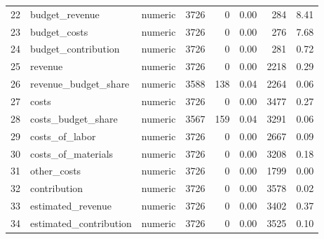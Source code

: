 \begin{sidewaystable}[ht]
\begin{tabular}{rllrrrrr}
  22 & budget\_revenue & numeric & 3726 &   0 & 0.00 & 284 & 8.41 \\ 
  23 & budget\_costs & numeric & 3726 &   0 & 0.00 & 276 & 7.68 \\ 
  24 & budget\_contribution & numeric & 3726 &   0 & 0.00 & 281 & 0.72 \\ 
  25 & revenue & numeric & 3726 &   0 & 0.00 & 2218 & 0.29 \\ 
  26 & revenue\_budget\_share & numeric & 3588 & 138 & 0.04 & 2264 & 0.06 \\ 
  27 & costs & numeric & 3726 &   0 & 0.00 & 3477 & 0.27 \\ 
  28 & costs\_budget\_share & numeric & 3567 & 159 & 0.04 & 3291 & 0.06 \\ 
  29 & costs\_of\_labor & numeric & 3726 &   0 & 0.00 & 2667 & 0.09 \\ 
  30 & costs\_of\_materials & numeric & 3726 &   0 & 0.00 & 3208 & 0.18 \\ 
  31 & other\_costs & numeric & 3726 &   0 & 0.00 & 1799 & 0.00 \\ 
  32 & contribution & numeric & 3726 &   0 & 0.00 & 3578 & 0.02 \\ 
  33 & estimated\_revenue & numeric & 3726 &   0 & 0.00 & 3402 & 0.37 \\ 
  34 & estimated\_contribution & numeric & 3726 &   0 & 0.00 & 3525 & 0.10 \\ 
   \hline
\end{tabular}
\end{sidewaystable}
